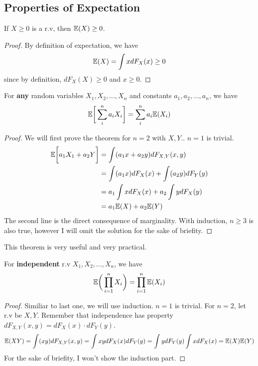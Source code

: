 \subsection*{Properties of Expectation}
\begin{theorem} If $X \ge 0$ is a r.v, then ${\mathbb{E}} (X) \ge 0$.
    \begin{proof}
        By definition of expectation, we have
        \[ {\mathbb{E}}(X) = \int x dF_X(x)  \ge 0 \]
        since by definition, $dF_X(X) \ge 0$ and $x \ge 0$.
    \end{proof}
\end{theorem}
\begin{theorem}[Linearity] For \textbf{any} random variables $X_1,X_2,...,X_n$ and constants $a_1,a_2,...,a_n$, we have 
    \[{\mathbb{E}} \bigg[ \sum^n_i a_iX_i \bigg] = \sum^n_i a_i{\mathbb{E}}({X_i})\]
    \begin{proof}
        We will first prove the theorem for $n=2$ with $X,Y$.. $n=1$ is trivial.
        \begin{align*}
            {\mathbb{E}} \bigg[ a_1X_1 + a_2Y\bigg] &= \int (a_1x+a_2y) dF_{X,Y}(x,y) \\
                                            &=\int (a_1x)dF_{X}(x) + \int (a_2y)dF_{Y}(y)\\
                                            &= a_1\int x dF_{X}(x) + a_2 \int y dF_{X}(y) \\
                                            &= a_1{\mathbb{E}}(X) + a_2{\mathbb{E}}(Y)
        \end{align*}
        The second line is the direct consequence of marginality.
        With induction, $n\ge 3$ is also true, however I will omit the solution for the sake of briefity.
    \end{proof}
    This theorem is very useful and very practical.
\end{theorem}
\begin{theorem}[multiplicity]
    For \textbf{independent} r.v $X_1,X_2,...,X_n$,  we have
    \[{\mathbb{E}} \bigg( \prod _{i=1}^nX_i \bigg) = \prod_{i=1}^n {\mathbb{E}}(X_i)\]
    \begin{proof}
        Similiar to last one, we will use induction. $n=1$ is trivial. For $n=2$, let r.v be $X,Y$. Remember that independence has property $dF_{X,Y}(x,y)= dF_{X}(x)\cdot dF_{Y}(y)$.
        \[{\mathbb{E}}(XY) = \int (xy)dF_{X,Y}(x,y) = \int xydF_{X}(x)dF_{Y}(y)= \int ydF_Y(y)\int xdF_X(x)= {\mathbb{E}}(X){\mathbb{E}}(Y)\]
        For the sake of briefity, I won't show the induction part.
    \end{proof}
\end{theorem}

